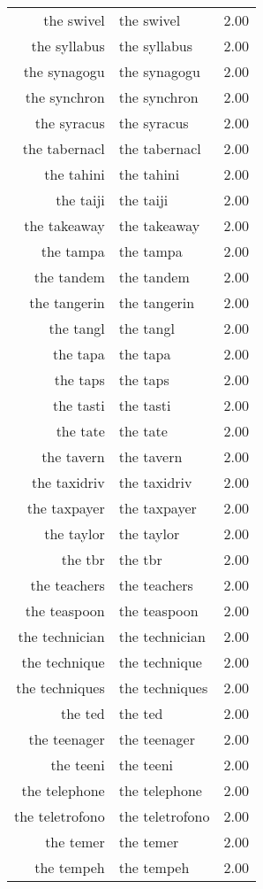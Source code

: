\begin{table}[ht]
\begin{tabular}{rlr}
  the swivel & the swivel & 2.00 \\ 
  the syllabus & the syllabus & 2.00 \\ 
  the synagogu & the synagogu & 2.00 \\ 
  the synchron & the synchron & 2.00 \\ 
  the syracus & the syracus & 2.00 \\ 
  the tabernacl & the tabernacl & 2.00 \\ 
  the tahini & the tahini & 2.00 \\ 
  the taiji & the taiji & 2.00 \\ 
  the takeaway & the takeaway & 2.00 \\ 
  the tampa & the tampa & 2.00 \\ 
  the tandem & the tandem & 2.00 \\ 
  the tangerin & the tangerin & 2.00 \\ 
  the tangl & the tangl & 2.00 \\ 
  the tapa & the tapa & 2.00 \\ 
  the taps & the taps & 2.00 \\ 
  the tasti & the tasti & 2.00 \\ 
  the tate & the tate & 2.00 \\ 
  the tavern & the tavern & 2.00 \\ 
  the taxidriv & the taxidriv & 2.00 \\ 
  the taxpayer & the taxpayer & 2.00 \\ 
  the taylor & the taylor & 2.00 \\ 
  the tbr & the tbr & 2.00 \\ 
  the teachers & the teachers & 2.00 \\ 
  the teaspoon & the teaspoon & 2.00 \\ 
  the technician & the technician & 2.00 \\ 
  the technique & the technique & 2.00 \\ 
  the techniques & the techniques & 2.00 \\ 
  the ted & the ted & 2.00 \\ 
  the teenager & the teenager & 2.00 \\ 
  the teeni & the teeni & 2.00 \\ 
  the telephone & the telephone & 2.00 \\ 
  the teletrofono & the teletrofono & 2.00 \\ 
  the temer & the temer & 2.00 \\ 
  the tempeh & the tempeh & 2.00 \\ 

\end{tabular}
\end{table}
